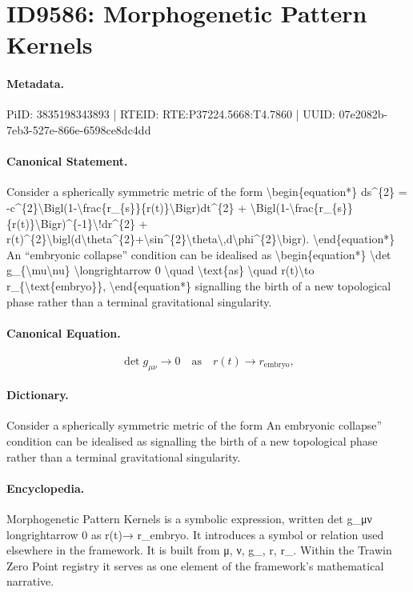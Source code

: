 \section*{ID9586: Morphogenetic Pattern Kernels}
\paragraph{Metadata.}
PiID: 3835198343893 | RTEID: RTE:P37224.5668:T4.7860 | UUID: 07e2082b-7eb3-527e-866e-6598ce8dc4dd

\paragraph{Canonical Statement.}
Consider a spherically symmetric metric of the form \textbackslash{}begin\{equation*\} ds\textasciicircum{}\{2\} = -c\textasciicircum{}\{2\}\textbackslash{}Bigl(1-\textbackslash{}frac\{r\_\{s\}\}\{r(t)\}\textbackslash{}Bigr)dt\textasciicircum{}\{2\} + \textbackslash{}Bigl(1-\textbackslash{}frac\{r\_\{s\}\}\{r(t)\}\textbackslash{}Bigr)\textasciicircum{}\{-1\}\textbackslash{}!dr\textasciicircum{}\{2\} + r(t)\textasciicircum{}\{2\}\textbackslash{}bigl(d\textbackslash{}theta\textasciicircum{}\{2\}+\textbackslash{}sin\textasciicircum{}\{2\}\textbackslash{}theta\textbackslash{},d\textbackslash{}phi\textasciicircum{}\{2\}\textbackslash{}bigr). \textbackslash{}end\{equation*\} An ``embryonic collapse'' condition can be idealised as \textbackslash{}begin\{equation*\} \textbackslash{}det g\_\{\textbackslash{}mu\textbackslash{}nu\} \textbackslash{}longrightarrow 0 \textbackslash{}quad \textbackslash{}text\{as\} \textbackslash{}quad r(t)\textbackslash{}to r\_\{\textbackslash{}text\{embryo\}\}, \textbackslash{}end\{equation*\} signalling the birth of a new topological phase rather than a terminal gravitational singularity.

\paragraph{Canonical Equation.}
\[
\det g_{\mu\nu} \longrightarrow 0 \quad \text{as} \quad r(t)\to r_{\text{embryo}},
\]

\paragraph{Dictionary.}
Consider a spherically symmetric metric of the form An embryonic collapse'' condition can be idealised as signalling the birth of a new topological phase rather than a terminal gravitational singularity.

\paragraph{Encyclopedia.}
Morphogenetic Pattern Kernels is a symbolic expression, written det g\_μν longrightarrow 0 as r(t)→ r\_embryo. It introduces a symbol or relation used elsewhere in the framework. It is built from μ, ν, g\_, r, r\_. Within the Trawin Zero Point registry it serves as one element of the framework's mathematical narrative.
